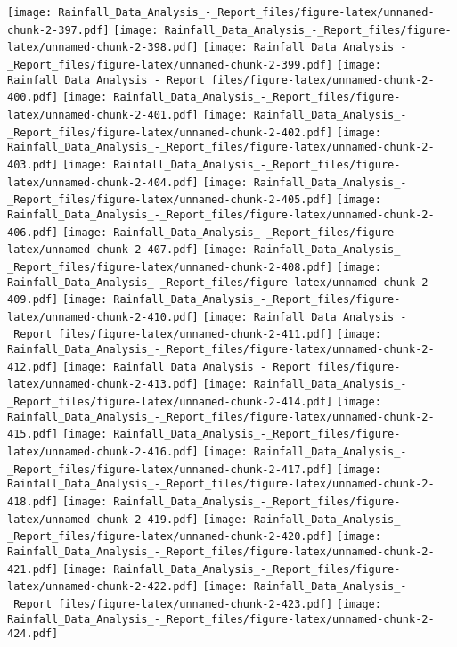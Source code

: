 \documentclass[
]{article}
\begin{document}
\texttt{[image: Rainfall\_Data\_Analysis\_-\_Report\_files/figure-latex/unnamed-chunk-2-397.pdf]}
\texttt{[image: Rainfall\_Data\_Analysis\_-\_Report\_files/figure-latex/unnamed-chunk-2-398.pdf]}
\texttt{[image: Rainfall\_Data\_Analysis\_-\_Report\_files/figure-latex/unnamed-chunk-2-399.pdf]}
\texttt{[image: Rainfall\_Data\_Analysis\_-\_Report\_files/figure-latex/unnamed-chunk-2-400.pdf]}
\texttt{[image: Rainfall\_Data\_Analysis\_-\_Report\_files/figure-latex/unnamed-chunk-2-401.pdf]}
\texttt{[image: Rainfall\_Data\_Analysis\_-\_Report\_files/figure-latex/unnamed-chunk-2-402.pdf]}
\texttt{[image: Rainfall\_Data\_Analysis\_-\_Report\_files/figure-latex/unnamed-chunk-2-403.pdf]}
\texttt{[image: Rainfall\_Data\_Analysis\_-\_Report\_files/figure-latex/unnamed-chunk-2-404.pdf]}
\texttt{[image: Rainfall\_Data\_Analysis\_-\_Report\_files/figure-latex/unnamed-chunk-2-405.pdf]}
\texttt{[image: Rainfall\_Data\_Analysis\_-\_Report\_files/figure-latex/unnamed-chunk-2-406.pdf]}
\texttt{[image: Rainfall\_Data\_Analysis\_-\_Report\_files/figure-latex/unnamed-chunk-2-407.pdf]}
\texttt{[image: Rainfall\_Data\_Analysis\_-\_Report\_files/figure-latex/unnamed-chunk-2-408.pdf]}
\texttt{[image: Rainfall\_Data\_Analysis\_-\_Report\_files/figure-latex/unnamed-chunk-2-409.pdf]}
\texttt{[image: Rainfall\_Data\_Analysis\_-\_Report\_files/figure-latex/unnamed-chunk-2-410.pdf]}
\texttt{[image: Rainfall\_Data\_Analysis\_-\_Report\_files/figure-latex/unnamed-chunk-2-411.pdf]}
\texttt{[image: Rainfall\_Data\_Analysis\_-\_Report\_files/figure-latex/unnamed-chunk-2-412.pdf]}
\texttt{[image: Rainfall\_Data\_Analysis\_-\_Report\_files/figure-latex/unnamed-chunk-2-413.pdf]}
\texttt{[image: Rainfall\_Data\_Analysis\_-\_Report\_files/figure-latex/unnamed-chunk-2-414.pdf]}
\texttt{[image: Rainfall\_Data\_Analysis\_-\_Report\_files/figure-latex/unnamed-chunk-2-415.pdf]}
\texttt{[image: Rainfall\_Data\_Analysis\_-\_Report\_files/figure-latex/unnamed-chunk-2-416.pdf]}
\texttt{[image: Rainfall\_Data\_Analysis\_-\_Report\_files/figure-latex/unnamed-chunk-2-417.pdf]}
\texttt{[image: Rainfall\_Data\_Analysis\_-\_Report\_files/figure-latex/unnamed-chunk-2-418.pdf]}
\texttt{[image: Rainfall\_Data\_Analysis\_-\_Report\_files/figure-latex/unnamed-chunk-2-419.pdf]}
\texttt{[image: Rainfall\_Data\_Analysis\_-\_Report\_files/figure-latex/unnamed-chunk-2-420.pdf]}
\texttt{[image: Rainfall\_Data\_Analysis\_-\_Report\_files/figure-latex/unnamed-chunk-2-421.pdf]}
\texttt{[image: Rainfall\_Data\_Analysis\_-\_Report\_files/figure-latex/unnamed-chunk-2-422.pdf]}
\texttt{[image: Rainfall\_Data\_Analysis\_-\_Report\_files/figure-latex/unnamed-chunk-2-423.pdf]}
\texttt{[image: Rainfall\_Data\_Analysis\_-\_Report\_files/figure-latex/unnamed-chunk-2-424.pdf]}
\end{document}
